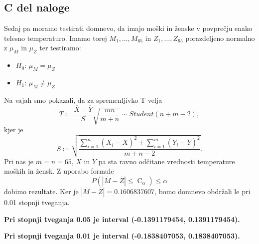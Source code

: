 \documentclass{article}
\DeclareMathOperator{\CM}{C}
\begin{document}
    \subsection{C del naloge}
    Sedaj pa moramo testirati domnevo, da imajo moški in ženske v povprečju enako telesno temperaturo. Imamo torej $M_{1}, \ldots, M_{65}$ in $Z_{1}, \ldots, Z_{65}$ porazdeljeno
    normalno z $\mu_{M}$ in $\mu_{Z}$ ter testiramo:
    \begin{itemize}
        \item $H_{0}$: $\mu_{M} = \mu_{Z}$
        \item $H_{1}$: $\mu_{M} \neq \mu_{Z}$
    \end{itemize}
    Na vajah smo pokazali, da za spremenljivko T velja
    \[
        T \coloneqq \frac{\overline{X} - \overline{Y}}{S}\sqrt{\frac{mn}{m + n}} \sim Student(n + m - 2),
    \]
    kjer je
    \[
        S \coloneqq \sqrt{\frac{\sum_{i = 1}^n (X_{i} - \overline{X})^2 + \sum_{i = 1}^m (Y_{i} - \overline{Y})^2}{m + n - 2}}.
    \]
    Pri nas je $m = n = 65$, $X$ in $Y$ pa sta ravno odčitane vrednosti temperature moških in žensk. Z uporabo formule
    \[
        P(|\overline{M} - \overline{Z}| \leq \CM_{\alpha}) \leq \alpha 
    \]
    dobimo rezultate. Ker je $|\overline{M} - \overline{Z}| = 0.1606837607$, bomo domnevo obdržali le pri 0.01 stopnji tveganja.
    \par \textbf{Pri stopnji tveganja 0.05 je interval (-0.1391179454, 0.1391179454).}
    \par \textbf{Pri stopnji tveganja 0.01 je interval (-0.1838407053, 0.1838407053).}
\end{document}
